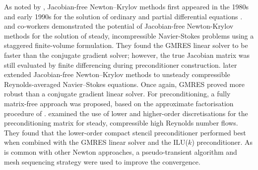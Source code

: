 \documentclass[sn-mathphys,Numbered]{sn-jnl}%
\begin{document}
As noted by \citet{Knoll2004}, Jacobian-free Newton–Krylov methods first appeared in the 1980s and early 1990s for the solution of ordinary and partial differential equations \citep{Gear1983, Chan1984, Brown1986, Brown1990}.
\citet{Mchugh1994} and co-workers demonstrated the potential of Jacobian-free Newton-Krylov methods for the solution of steady, incompressible Navier-Stokes problems using a staggered finite-volume formulation.
They found the GMRES linear solver to be faster than the conjugate gradient solver; however, the true Jacobian matrix was still evaluated by finite differencing during preconditioner construction.
\citet{Qin2000} later extended Jacobian-free Newton–Krylov methods to unsteady compressible Reynolds-averaged Navier–Stokes equations.
Once again, GMRES proved more robust than a conjugate gradient linear solver.
For preconditioning, a fully matrix-free approach was proposed, based on the approximate factorisation procedure of \citet{Badcock1996}.
\citet{Geuzaine2001} examined the use of lower and higher-order discretisations for the preconditioning matrix for steady, compressible high Reynolds number flows.
They found that the lower-order compact stencil preconditioner performed best when combined with the GMRES linear solver and the ILU($k$) preconditioner.
As is common with other Newton approaches, a pseudo-transient algorithm and mesh sequencing strategy were used to improve the convergence.
\end{document}
